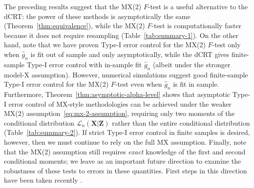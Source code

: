 \documentclass[ejs]{imsart}
\numberwithin{equation}{section}
\theoremstyle{plain}
\theoremstyle{definition}
\theoremstyle{remark}
\newcommand{\prx}{\bm X}
\newcommand{\prz}{\bm Z}
\newcommand{\pry}{{\bm Y}}
\begin{document}
The preceding results suggest that the MX(2) $F$-test is a useful alternative to the dCRT: the power of these methods is asymptotically the same (Theorem~\ref{thm:equivalence}), while the MX(2) $F$-test is computationally faster because it does not require resampling (Table~\ref{tab:summary-1}). On the other hand, note that we have proven Type-I error control for the MX(2) $F$-test only when $\widehat g_n$ is fit out of sample and only asymptotically, while the dCRT gives finite-sample Type-I error control with in-sample fit $\widehat g_n$ (albeit under the stronger model-X assumption). However, numerical simulations suggest good finite-sample Type-I error control for the MX(2) $F$-test even when $\widehat g_n$ is fit in sample. Furthermore, Theorem~\ref{thm:asymptotic-alpha-level} shows that asymptotic Type-I error control of MX-style methodologies can be achieved under the weaker MX(2) assumption~\eqref{eq:mx-2-assumption}, requiring only two moments of the conditional distribution $\mathcal L_n(\prx|\prz)$ rather than the entire conditional distribution (Table~\ref{tab:summary-2}). If strict Type-I error control in finite samples is desired, however, then we must continue to rely on the full MX assumption. %
Finally, note that the MX(2) assumption still requires \textit{exact} knowledge of the first and second conditional moments; we leave as an important future direction to examine the robustness of these tests to errors in these quantities. First steps in this direction have been taken recently \cite{Berrett2019, Li2022a}.



\end{document}
